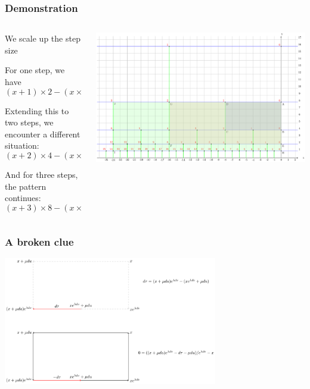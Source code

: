 \documentclass[aspectratio=169]{beamer}
\begin{document}
\begin{frame}
    \frametitle{Demonstration}
    \begin{columns}
        \begin{column}{0.5\textwidth}
            We scale up the step size

            For one step, we have
            \begin{equation}
            (x + 1) \times 2 - (x \times 2 + 1) = 1
            \end{equation}

            Extending this to two steps, we encounter a different situation:
            \begin{equation}
            (x + 2) \times 4 - (x \times 4 + 2) = 6
            \end{equation}

            And for three steps, the pattern continues:
            \begin{equation}
            (x + 3) \times 8 - (x \times 8 + 3) = 21
            \end{equation}
        \end{column}
        \begin{column}{0.5\textwidth}
            \begin{center}
                \includegraphics[width=1.0\textwidth]{../images/17-area-formula}
            \end{center}
        \end{column}
    \end{columns}
\end{frame}

\begin{frame}
    \frametitle{A broken clue}
    \begin{center}
        \includegraphics[width=0.7\textwidth]{../images/19-curl}
    \end{center}
\end{frame}
\end{document}
